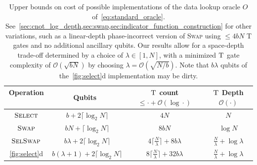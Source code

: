 \documentclass[a4paper,onecolumn,10pt,accepted=2024-05-22]{quantumarticle}
\begin{document}
	{
		\renewcommand{\arraystretch}{1.1}
		\begin{table}
  \centering
			\begin{tabular}{c|c|c|c}
				\shortstack{Operation\\$\;$}&\shortstack{Qubits\\$\;$}&\shortstack{$\textsc{T}$ count\\ $\le\cdot+\mathcal{O}(\log\cdot)$}&\shortstack{$\textsc{T}$ Depth\\$\mathcal{O}(\cdot)$}\\
				\hline
				$\textsc{Select}$&$b+2\lceil\log_2{N}\rceil$&$4N$&$N$
				\\
				$\textsc{Swap}$&$bN+\lceil\log_2{N}\rceil$&8$bN$&$\log{N}$ 
				\\
				$\textsc{SelSwap}$&$b\lambda +2\lceil\log_2{N}\rceil$&$4\lceil\frac{N}{\lambda}\rceil+8b\lambda$&$\frac{N}{\lambda}+\log{\lambda}$
				\\
				{\cref{fig:select}d}&$b(\lambda+1) +2\lceil\log_2{N}\rceil$&$8\lceil\frac{N}{\lambda}\rceil+32b\lambda$&$\frac{N}{\lambda}+\log{\lambda}$
			\end{tabular}
			\caption{\label{tab:cost_comparison}Upper bounds on cost of possible implementations of the data lookup oracle $O$ of~\cref{eq:standard_oracle}. See~\cref{sec:cnot_log_depth,sec:swap,sec:indicator_function_construction} for other variations, such as a linear-depth phase-incorrect version of \textsc{Swap} using $\le 4bN$ \textsc{T} gates and no additional ancillary qubits. Our results allow for a space-depth trade-off determined by a choice of $\lambda\in[1,N]$, with a minimized $\textsc{T}$ gate complexity of ${\mathcal{O}}(\sqrt{bN})$ by choosing $\lambda=\mathcal{O}(\sqrt{N/b})$. Note that $b\lambda$ qubits of the~\cref{fig:select}d implementation may be dirty.}
		\end{table}
	}
 
\end{document}
